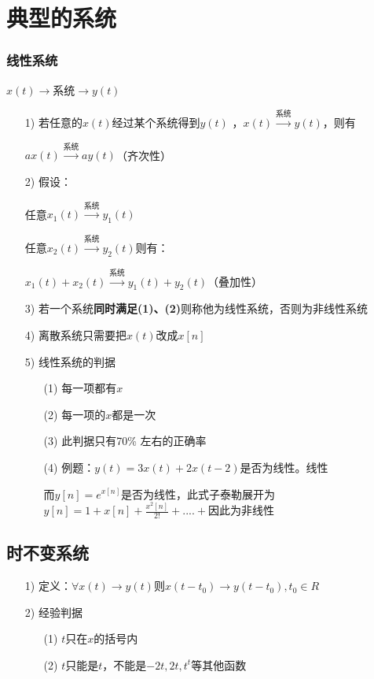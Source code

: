 \documentclass{ctexart}
\numberwithin{figure}{section}
\numberwithin{equation}{section}
\begin{document}
    \section{典型的系统}
        \subsubsection{线性系统}
        $x(t)\longrightarrow \boxed{\text{系统}}\longrightarrow y(t)$

        
            \begin{enumerate}
                \item[1)] 若任意的$x(t)$经过某个系统得到$y(t)$ ，$x(t)\xrightarrow{\text{系统}}y(t)$，则有

                $ax(t)\xrightarrow{\text{系统}}ay(t)$（齐次性）
                \item[2)] 假设：
                
                任意$x_1(t)\xrightarrow{\text{系统}}y_1(t)$

                任意$x_2(t)\xrightarrow{\text{系统}}y_2(t)$则有：

                $x_1(t)+x_2(t)\xrightarrow{\text{系统}}y_1(t)+y_2(t)$（叠加性）
                \item[3)] 若一个系统\textbf{同时满足(1)、(2)}则称他为线性系统，否则为非线性系统
                \item[4)] 离散系统只需要把$x(t)$改成$x[n]$ 
                \item[5)] 线性系统的判据
                    \begin{enumerate}
                        \item[(1)] 每一项都有$x$
                        \item[(2)] 每一项的$x$都是一次
                        \item[(3)] 此判据只有70\% 左右的正确率
                        \item[(4)] 例题：$y(t)=3x(t)+2x(t-2)$是否为线性。线性  
                        
                        而$\displaystyle y[n]=e^{x[n]}$是否为线性，此式子泰勒展开为$\displaystyle y[n]=1+x[n]+\frac{x^2[n]}{2!}+....+$因此为非线性
                    \end{enumerate}
            \end{enumerate}
        \subsection{时不变系统}
            \begin{enumerate}
                \item[1)] 定义：$\forall x(t)\rightarrow y(t)$则$x(t-t_0)\rightarrow y(t-t_0),t_0\in R$ 
                \item[2)] 经验判据
                    \begin{enumerate}
                        \item[(1)] $t$只在$x$的括号内
                        \item[(2)] $t$只能是$t$，不能是$-2t,2t,t^t$等其他函数
                    \end{enumerate} 
            \end{enumerate}
\end{document}
